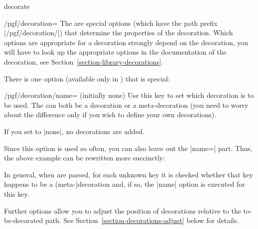 \begin{pathoperation}{decorate}{}
\begin{key}{/pgf/decoration=}
        The  are special options (which have the path
        prefix |/pgf/decoration/|) that determine the properties of the
        decoration. Which options are appropriate for a decoration strongly
        depend on the decoration, you will have to look up the appropriate
        options in the documentation of the decoration, see
        Section~\ref{section-library-decorations}.

        There is one option (available only in \tikzname) that is special:
        \begin{key}{/pgf/decoration/name= (initially none)}
            Use this key to set which decoration is to be used. The 
            can both be a decoration or a meta-decoration (you need to worry
            about the difference only if you wish to define your own
            decorations).

            If you set  to |none|, no decorations are added.
\begin{codeexample}[]
\end{codeexample}
            Since this option is used so often, you can also leave out the
            |name=| part. Thus, the above example can be rewritten more
            succinctly:
\begin{codeexample}[]
\end{codeexample}
            In general, when  are parsed, for each
            unknown key it is checked whether that key happens to be a
            (meta-)decoration and, if so, the |name| option is executed for
            this key.
        \end{key}

        Further options allow you to adjust the position of decorations
        relative to the to-be-decorated path. See
        Section~\ref{section-decorations-adjust} below for details.
    \end{key}


\end{pathoperation}
